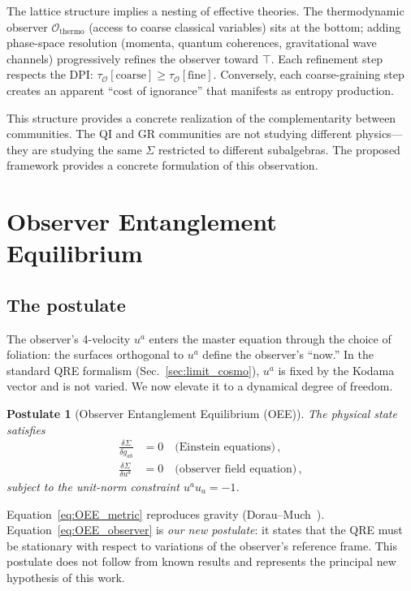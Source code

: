 \documentclass[prd,twocolumn,superscriptaddress,longbibliography,floatfix]{revtex4-2}
\newtheorem{postulate}{Postulate}
\newcommand{\tauasym}{\tau}
\newcommand{\tauO}{\tauasym_{\mathcal{O}}}
\begin{document}
The lattice structure implies a nesting
of effective theories.  The thermodynamic
observer $\mathcal{O}_{\mathrm{thermo}}$
(access to coarse classical variables) sits
at the bottom; adding phase-space resolution
(momenta, quantum coherences, gravitational
wave channels) progressively refines the
observer toward $\top$.  Each refinement
step respects the DPI:
$\tauO[\mathrm{coarse}]
\geq \tauO[\mathrm{fine}]$.
Conversely, each coarse-graining step
creates an apparent ``cost of ignorance''
that manifests as entropy production.

This structure provides a concrete
realization of the complementarity between
communities.  The QI and GR communities are
not studying different physics---they are
studying the same $\Sigma$ restricted to
different subalgebras.  The proposed framework
provides a concrete formulation of this observation.


\section{Observer Entanglement Equilibrium}
\label{sec:OEE}

\subsection{The postulate}

The observer's 4-velocity $u^a$ enters the master equation
through the choice of foliation: the surfaces orthogonal
to $u^a$ define the observer's ``now.''  In the standard
QRE formalism (Sec.~\ref{sec:limit_cosmo}), $u^a$ is
fixed by the Kodama vector and is not varied.  We now
elevate it to a dynamical degree of freedom.

\begin{postulate}[Observer Entanglement Equilibrium (OEE)]
\label{post:OEE}
The physical state satisfies
\begin{align}
\frac{\delta\Sigma}{\delta g_{ab}} &= 0
\quad\text{(Einstein equations)}\,,
\label{eq:OEE_metric}\\[4pt]
\frac{\delta\Sigma}{\delta u^a} &= 0
\quad\text{(observer field equation)}\,,
\label{eq:OEE_observer}
\end{align}
subject to the unit-norm constraint $u^a u_a = -1$.
\end{postulate}

Equation~\eqref{eq:OEE_metric} reproduces gravity
(Dorau--Much~\cite{DorauMuch2025}).
Equation~\eqref{eq:OEE_observer} is \emph{our new
postulate}: it states that the QRE must be stationary
with respect to variations of the observer's reference
frame.  This postulate does not follow from known
results and represents the principal new hypothesis of
this work.
\end{document}
